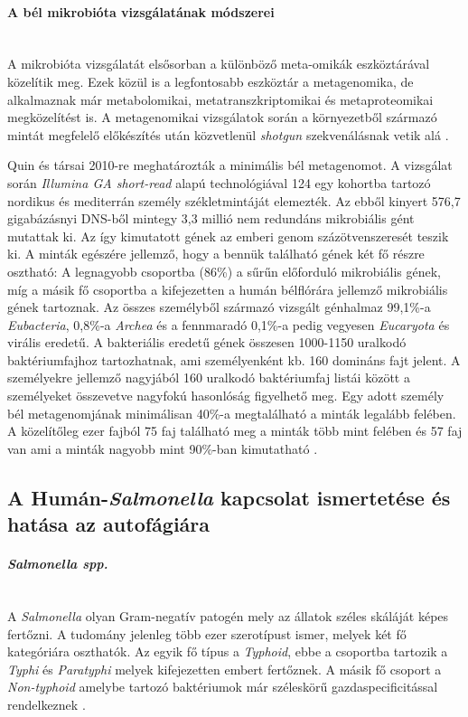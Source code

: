 \documentclass[a4paper,12pt]{article}
\begin{document}
		\paragraph{A bél mikrobióta vizsgálatának módszerei} \mbox{}\\
		A mikrobióta vizsgálatát elsősorban a különböző meta-omikák eszköztárával közelítik meg. Ezek közül is a legfontosabb eszköztár a metagenomika, de alkalmaznak már metabolomikai, metatranszkriptomikai és metaproteomikai megközelítést is. A metagenomikai vizsgálatok során a környezetből származó mintát megfelelő előkészítés után közvetlenül \textit{shotgun} szekvenálásnak vetik alá \cite{gut_microbiome}.

		Quin és társai 2010-re meghatározták a minimális bél metagenomot. A vizsgálat során \textit{Illumina GA short-read} alapú technológiával 124 egy kohortba tartozó nordikus és mediterrán személy székletmintáját elemezték. Az ebből kinyert 576,7 gigabázásnyi DNS-ből mintegy 3,3 millió nem redundáns mikrobiális gént mutattak ki. Az így kimutatott gének az emberi genom százötvenszeresét teszik ki. A minták egészére jellemző, hogy a bennük található gének két fő részre osztható: A legnagyobb csoportba (86\%) a sűrűn előforduló mikrobiális gének, míg a másik fő csoportba a kifejezetten a humán bélflórára jellemző mikrobiális gének tartoznak. Az összes személyből származó vizsgált génhalmaz 99,1\%-a \textit{Eubacteria}, 0,8\%-a \textit{Archea} és a fennmaradó 0,1\%-a pedig vegyesen \textit{Eucaryota} és virális eredetű. A bakteriális eredetű gének összesen 1000-1150 uralkodó baktériumfajhoz tartozhatnak, ami személyenként kb. 160 domináns fajt jelent. A személyekre jellemző nagyjából 160 uralkodó baktériumfaj listái között a személyeket összevetve nagyfokú hasonlóság figyelhető meg. Egy adott személy bél metagenomjának minimálisan 40\%-a megtalálható a minták legalább felében. A közelítőleg ezer fajból 75 faj található meg a minták több mint felében és 57 faj van ami a minták nagyobb mint 90\%-ban kimutatható  \cite{meta_omics}.


	\subsection{A Humán-\textit{Salmonella} kapcsolat ismertetése és hatása az autofágiára}

		\paragraph{\textit{Salmonella spp.}} \mbox{}\\
		A \textit{Salmonella} olyan Gram-negatív patogén mely az állatok széles skáláját képes fertőzni. A tudomány jelenleg több ezer szerotípust ismer, melyek két fő kategóriára oszthatók. Az egyik fő típus a \textit{Typhoid}, ebbe a csoportba tartozik a \textit{Typhi} és \textit{Paratyphi} melyek kifejezetten embert fertőznek. A másik fő csoport a \textit{Non-typhoid} amelybe tartozó baktériumok már széleskörű gazdaspecificitással rendelkeznek \cite{salmonella_and_host_cell_nature}.
\end{document}
